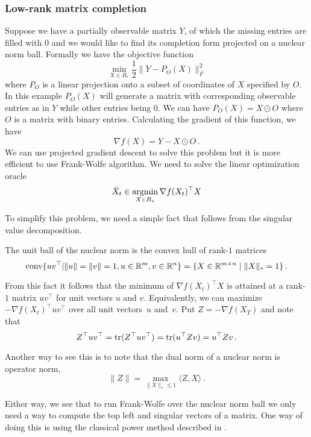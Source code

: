 \subsubsection{Low-rank matrix completion}

Suppose we have a partially observable matrix $Y$, of which the missing entries are filled with 0 and we would like to find its completion form projected on a nuclear norm ball. Formally we have the objective function
\[
\min_{X\in B_*}\frac{1}{2}\|Y-P_O(X)\|_F^2
\]
where $P_O$ is a linear projection onto a subset of coordinates of $X$ specified by $O$. In this example $P_O(X)$ will generate a matrix with corresponding observable entries as in $Y$ while other entries being 0. We can have $P_O(X) = X \odot O$ where $O$ is a matrix with binary entries.
Calculating the gradient of this function, we have
\[
\nabla f(X) = Y-X \odot O\,.
\]
We can use projected gradient descent to solve this problem but it is more efficient to use Frank-Wolfe algorithm. We need to solve the linear optimization oracle
\[
\bar{X}_t\in \mathop{\rm argmin}_{X\in{B_*}}\nabla f(X_t)^\top X
\]

To simplify this problem, we need a simple fact that follows from the singular
value decomposition.
%
\begin{fact}
The unit ball of the nuclear norm is the convex hull of rank-$1$ matrices
\[
\mathrm{conv}\{uv^\top|\|u\|=\|v\|=1, u\in\mathbb{R}^m, v\in\mathbb{R}^n\}
=\{X\in\mathbb{R}^{m\times n}\mid \|X\|_*=1\}\,.
\]
\end{fact}

From this fact it follows that the minimum of $\nabla f(X_t)^\top X$ is attained
at a rank-$1$ matrix $uv^\top$ for unit vectors $u$ and $v$. 
Equivalently, we can maximize $-\nabla f(X_t)^\top uv^\top$ 
over all unit vectors~$u$ and~$v.$ Put
$Z = -\nabla f(X_T)$ and note that
\[
Z^\top uv^\top = \mathrm{tr}(Z^\top uv^\top) = \mathrm{tr}(u^\top Z v) = u^\top Z v\,.
\]

Another way to see this is to note that 
the dual norm of a nuclear norm is operator norm,
\[
\|Z\| = \max_{\|X\|_*\leq 1}\langle Z, X\rangle\,.
\]

Either way, we see that to run Frank-Wolfe over the nuclear norm ball we only
need a way to compute the top left and singular vectors of a matrix. One way of
doing this is using the classical power method described in .

